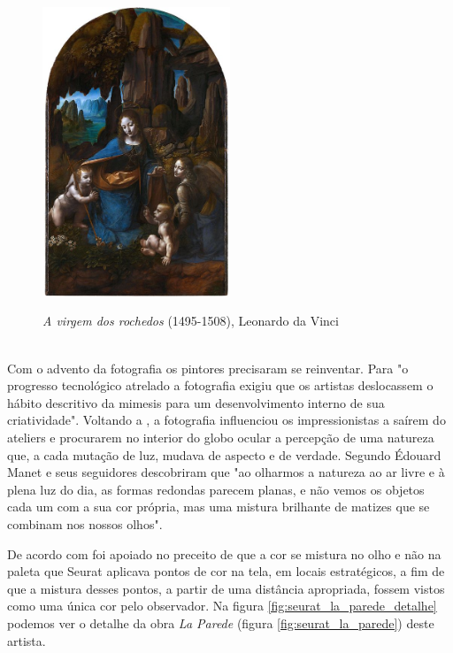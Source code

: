 \begin{figure}[H]
    \centering
    \caption{\textit{A virgem dos rochedos} (1495-1508), Leonardo da Vinci}
	\vspace*{0,2cm}
    \includegraphics[width=0.5\textwidth]{./04-figuras/da_vinci_virgem_rochedos}
    \label{fig:da_vinci_virgem_rochedos}
\end{figure}
\vspace*{-0,9cm}
{\raggedright {}}\\


Com o advento da fotografia os pintores precisaram se reinventar. Para  "o progresso tecnológico atrelado a fotografia exigiu que os artistas deslocassem o hábito descritivo da mimesis para um desenvolvimento interno de sua criatividade". Voltando a , a fotografia influenciou os impressionistas a saírem do ateliers e procurarem no interior do globo ocular a percepção de uma natureza que, a cada mutação de luz, mudava de aspecto e de verdade. Segundo  Édouard Manet e seus seguidores descobriram que "ao olharmos a natureza ao ar livre e à plena luz do dia, as formas redondas parecem planas, e não vemos os objetos cada um com a sua cor própria, mas uma mistura brilhante de matizes que se combinam nos nossos olhos".


De acordo com  foi apoiado no preceito de que a cor se mistura no olho e não na paleta que Seurat aplicava pontos de cor na tela, em locais estratégicos, a fim de que a mistura desses pontos, a partir de uma distância apropriada, fossem vistos como uma única cor pelo observador. Na figura \ref{fig:seurat_la_parede_detalhe} podemos ver o detalhe da obra \textit{La Parede} (figura \ref{fig:seurat_la_parede}) deste artista.

